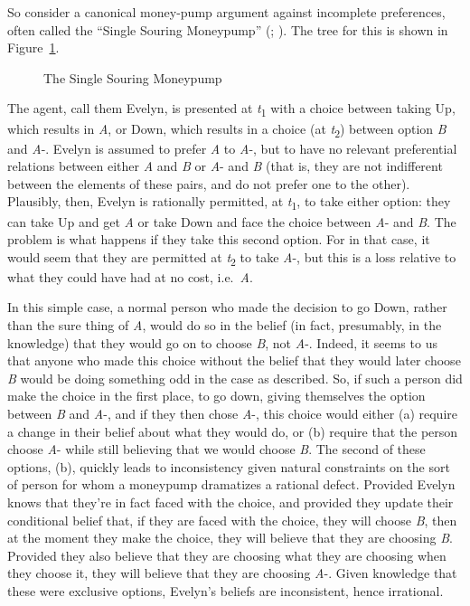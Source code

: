 \documentclass[
  11pt,
  letterpaper,
  DIV=11,
  numbers=noendperiod,
  twoside]{scrartcl}
\begin{document}
So consider a canonical money-pump argument against incomplete
preferences, often called the ``Single Souring Moneypump''
(;
). The tree for this
is shown in Figure~\ref{fig-single-souring}.

\begin{figure}

\centering{



}

\caption{\label{fig-single-souring}The Single Souring Moneypump}

\end{figure}%

The agent, call them Evelyn, is presented at \emph{t}\textsubscript{1}
with a choice between taking Up, which results in \emph{A}, or Down,
which results in a choice (at \emph{t}\textsubscript{2}) between option
\emph{B} and \emph{A}-. Evelyn is assumed to prefer \emph{A} to
\emph{A}-, but to have no relevant preferential relations between either
\emph{A} and \emph{B} or \emph{A}- and \emph{B} (that is, they are not
indifferent between the elements of these pairs, and do not prefer one
to the other). Plausibly, then, Evelyn is rationally permitted, at
\emph{t}\textsubscript{1}, to take either option: they can take Up and
get \emph{A} or take Down and face the choice between \emph{A}- and
\emph{B}. The problem is what happens if they take this second option.
For in that case, it would seem that they are permitted at
\emph{t}\textsubscript{2} to take \emph{A}-, but this is a loss relative
to what they could have had at no cost, i.e.~\emph{A}.

In this simple case, a normal person who made the decision to go Down,
rather than the sure thing of \emph{A}, would do so in the belief (in
fact, presumably, in the knowledge) that they would go on to choose
\emph{B}, not \emph{A}-. Indeed, it seems to us that anyone who made
this choice without the belief that they would later choose \emph{B}
would be doing something odd in the case as described. So, if such a
person did make the choice in the first place, to go down, giving
themselves the option between \emph{B} and \emph{A}-, and if they then
chose \emph{A}-, this choice would either (a) require a change in their
belief about what they would do, or (b) require that the person choose
\emph{A}- while still believing that we would choose \emph{B}. The
second of these options, (b), quickly leads to inconsistency given
natural constraints on the sort of person for whom a moneypump
dramatizes a rational defect. Provided Evelyn knows that they're in fact
faced with the choice, and provided they update their conditional belief
that, if they are faced with the choice, they will choose \emph{B}, then
at the moment they make the choice, they will believe that they are
choosing \emph{B}. Provided they also believe that they are choosing
what they are choosing when they choose it, they will believe that they
are choosing \emph{A}-. Given knowledge that these were exclusive
options, Evelyn's beliefs are inconsistent, hence irrational.
\end{document}
